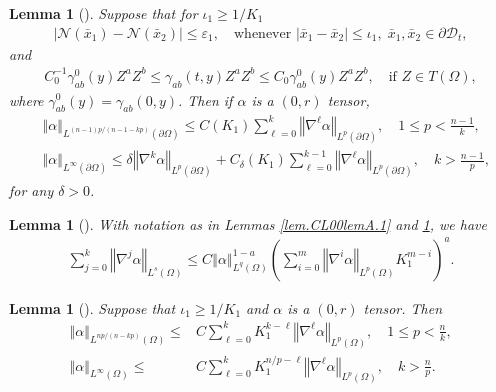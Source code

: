 \documentclass[12pt,reqno]{amsart}
\numberwithin{equation}{section}
\newtheorem{lemma}[theorem]{Lemma}
\theoremstyle{definition}
\theoremstyle{remark}
\begin{document}
\begin{lemma}[\mbox{\cite[Lemma A.2]{CL00}}] \label{lem.CL00lemA.2}
  Suppose that for $\iota_1{\geqslant} 1/K_1$
  \begin{align}
    {\left\vert{{\mathcal{N}}(\bar{x}_1)-{\mathcal{N}}(\bar{x}_2)}\right\vert}{\leqslant} {\varepsilon}_1, \quad \text{whenever } |\bar{x}_1-\bar{x}_2|{\leqslant} \iota_1, \; \bar{x}_1,\bar{x}_2\in{\partial}{{\mathscr{D}_t}},
  \end{align}
  and
  \begin{align}
    C_0^{-1}\gamma_{ab}^0(y) Z^aZ^b{\leqslant} \gamma_{ab}(t,y)Z^aZ^b{\leqslant} C_0\gamma_{ab}^0(y) Z^aZ^b, \quad \text{if } Z\in T(\Omega),
  \end{align}
  where $\gamma_{ab}^0(y)=\gamma_{ab}(0,y)$. Then if $\alpha$ is a $(0,r)$ tensor,
  \begin{align}
    &{\left\Vert{\alpha}\right\Vert}_{L^{(n-1)p/(n-1-kp)}({\partial}\Omega)}{\leqslant} C(K_1) \sum_{\ell=0}^k {\left\Vert{{\nabla}^\ell \alpha}\right\Vert}_{L^p({\partial}\Omega)}, \quad 1{\leqslant} p<\frac{n-1}{k},\\
    &{\left\Vert{\alpha}\right\Vert}_{L^\infty({\partial}\Omega)}{\leqslant} \delta{\left\Vert{{\nabla}^k \alpha}\right\Vert}_{L^p({\partial}\Omega)}+C_\delta(K_1)\sum_{\ell=0}^{k-1} {\left\Vert{{\nabla}^\ell \alpha}\right\Vert}_{L^p({\partial}\Omega)}, \quad k>\frac{n-1}{p},\label{eq.A.32}
  \end{align}
  for any $\delta>0$.
\end{lemma}

\begin{lemma}[\mbox{\cite[Lemma A.3]{CL00}}] \label{lem.CL00lemA.3}
  With notation as in Lemmas \ref{lem.CL00lemA.1} and \ref{lem.CL00lemA.2}, we have
  \begin{align}
    \sum_{j=0}^k{\left\Vert{{\nabla}^j\alpha}\right\Vert}_{L^s(\Omega)}{\leqslant} C{\left\Vert{\alpha}\right\Vert}_{L^q(\Omega)}^{1-a}\left(\sum_{i=0}^m {\left\Vert{{\nabla}^i\alpha}\right\Vert}_{L^p(\Omega)}K_1^{m-i}\right)^a.
  \end{align}
\end{lemma}

\begin{lemma}[\mbox{\cite[Lemma A.4]{CL00}}] \label{lem.CL00lemA.4}
  Suppose that $\iota_1{\geqslant} 1/K_1$ and $\alpha$ is a $(0,r)$ tensor. Then
  \begin{align}
    {\left\Vert{\alpha}\right\Vert}_{L^{np/(n-kp)}(\Omega)} {\leqslant}& C\sum_{\ell=0}^k K_1^{k-\ell} {\left\Vert{{\nabla}^\ell \alpha}\right\Vert}_{L^p(\Omega)}, \quad 1{\leqslant} p<\frac{n}{k},\label{eq.A.4.1}\\
    {\left\Vert{\alpha}\right\Vert}_{L^\infty(\Omega)}{\leqslant} &C\sum_{\ell=0}^k K_1^{n/p-\ell} {\left\Vert{{\nabla}^\ell \alpha}\right\Vert}_{L^p(\Omega)}, \quad k>\frac{n}{p}.\label{eq.A.4.2}
  \end{align}
\end{lemma}
\end{document}
